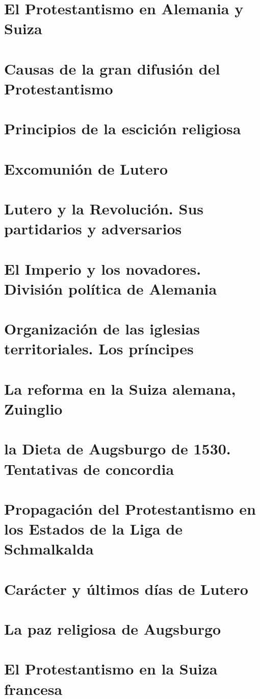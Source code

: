 \raggedbottom{} \documentclass[12pt, a4paper]{book}
\begin{document}
\section{El Protestantismo en Alemania y Suiza}
\section{Causas de la gran difusión del Protestantismo}
\section{Principios de la escición religiosa}
\section{Excomunión de Lutero}
\section{Lutero y la Revolución. Sus partidarios y adversarios}
\section{El Imperio y los novadores. División política de Alemania}
\section{Organización de las iglesias territoriales. Los príncipes}
\section{La reforma en la Suiza alemana, Zuinglio}
\section{la Dieta de Augsburgo de 1530. Tentativas de concordia}
\section{Propagación del Protestantismo en los Estados de la Liga de Schmalkalda}
\section{Carácter y últimos días de Lutero}
\section{La paz religiosa de Augsburgo}
\section{El Protestantismo en la Suiza francesa}
\end{document}
